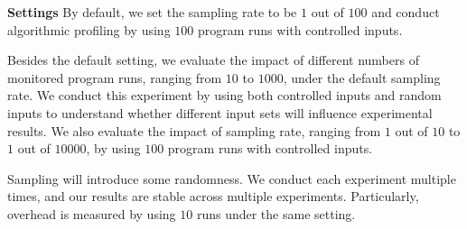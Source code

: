 \noindent\textbf{Settings}
By default, we set the sampling rate to be $1$ out of $100$ 
and conduct algorithmic profiling by using $100$ program runs with controlled inputs.  

Besides the default setting,
we evaluate the impact of different numbers of monitored program runs, 
ranging from $10$ to $1000$, under the default sampling rate.
We conduct this experiment by using both controlled inputs and random inputs 
to understand whether different input sets will influence experimental results.
We also evaluate the impact of sampling rate, ranging from $1$ out of $10$ to $1$ out of $10000$, 
by using $100$ program runs with controlled inputs.  

Sampling will introduce some randomness. 
We conduct each experiment multiple times, 
and our results are stable across multiple experiments. 
Particularly, overhead is measured by using $10$ runs under the same setting. 




















%
%





